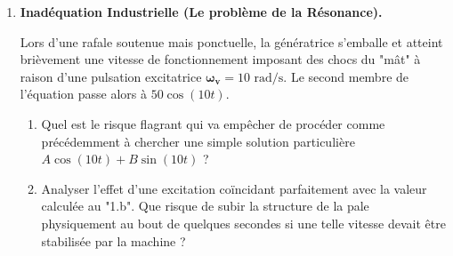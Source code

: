 \documentclass[a4paper,11pt]{article}
\begin{document}
\begin{enumerate}
    \item \textbf{Inadéquation Industrielle (Le problème de la Résonance).}
    
    Lors d'une rafale soutenue mais ponctuelle, la génératrice s'emballe et atteint brièvement une vitesse de fonctionnement imposant des chocs du "mât" à raison d'une pulsation excitatrice $\boldsymbol{\omega_v} = 10 \text{ rad/s}$.
    Le second membre de l'équation passe alors à $50\cos(10t)$.
    
    \begin{enumerate}
        \item Quel est le risque flagrant qui va empêcher de procéder comme précédemment à chercher une simple solution particulière $A\cos(10t) + B\sin(10t)$ ?
        \vspace{2.5cm}
        \item Analyser l'effet d'une excitation coïncidant parfaitement avec la valeur calculée au "1.b". Que risque de subir la structure de la pale physiquement au bout de quelques secondes si une telle vitesse devait être stabilisée par la machine ?
        \vspace{3.5cm}
    \end{enumerate}
    
\end{enumerate}
\end{document}
